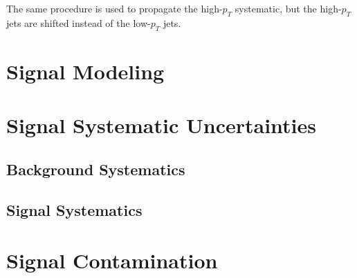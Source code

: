 The same procedure is used to propagate the high-$p_T$ systematic, but
the high-$p_T$ jets are shifted instead of the low-$p_T$ jets.

\section{Signal Modeling}
\section{Signal Systematic Uncertainties}
\subsection{Background Systematics}
\subsection{Signal Systematics}
\section{Signal Contamination}

